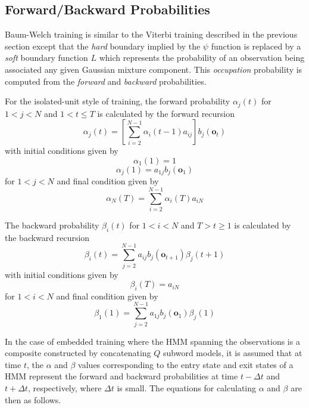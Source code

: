 \subsection{Forward/Backward Probabilities}

Baum-Welch training is similar to the Viterbi training described
in the previous section except that the \textit{hard} boundary implied
by the $\psi$ function is replaced by a \textit{soft} boundary
function $L$ which represents the probability of an observation being
associated any given Gaussian mixture component.  
This \textit{occupation} probability is computed from the \textit{forward}
and \textit{backward} probabilities.

For the isolated-unit style of training, the forward 
probability $\alpha_j(t)$ for $1<j<N$ and
$1<t \leq T$ is calculated by the forward recursion
\[
    \alpha_j(t) = \left[ \sum_{i=2}^{N-1} \alpha_i(t-1) a_{ij} \right]
                     b_j(\bm{o}_t)
\]
with initial conditions given by 
\[
    \alpha_1(1) = 1
\]
\[
    \alpha_j(1) = a_{1j} b_j(\bm{o}_1)
\]
for $1<j<N$ and final condition given by
\[
    \alpha_N(T) = \sum_{i=2}^{N-1} \alpha_i(T) a_{iN}
\]

The backward probability $\beta_i(t)$ for $1<i<N$ and $T>t \geq 1$ is 
calculated by the backward recursion
\[
   \beta_i(t) = \sum_{j=2}^{N-1} a_{ij} b_j(\bm{o}_{t+1}) \beta_j(t+1)
\]
with initial conditions given by
\[
   \beta_i(T) = a_{iN}
\]
for $1<i<N$ and final condition given by
\[
   \beta_1(1) = \sum_{j=2}^{N-1} a_{1j} b_j(\bm{o}_1) \beta_j(1)
\]

In the case of embedded training where the HMM spanning the observations
is a composite constructed by concatenating $Q$ subword models, it is
assumed that at time $t$, the $\alpha$ and $\beta$
values corresponding to the entry state and exit states of a HMM
represent the forward and backward probabilities at time $t-\Delta t$
and $t+\Delta t$, respectively, where $\Delta t$ is small.  The equations
for calculating $\alpha$ and $\beta$ are then as follows.

